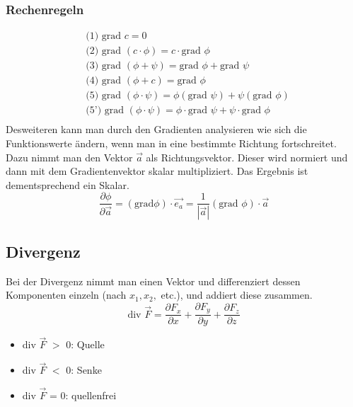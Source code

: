 \documentclass[a4paper,10pt]{scrartcl}
\begin{document}
        \subsubsection*{Rechenregeln}
        \begin{equation*}
            \begin{aligned}
                & \text{(1) } \text{grad } c = 0 \\
                & \text{(2) } \text{grad } (c \cdot \phi) = c \cdot \text{grad }\phi \\
                & \text{(3) } \text{grad } (\phi + \psi) = \text{grad } \phi + \text{grad } \psi \\
                & \text{(4) } \text{grad } (\phi + c) = \text{grad } \phi \\
                & \text{(5) } \text{grad } (\phi \cdot \psi)= \phi(\text{grad } \psi) + \psi(\text{grad } \phi) \\
                & \text{(5') } \text{grad } (\phi \cdot \psi)= \phi \cdot \text{grad } \psi + \psi \cdot \text{grad } \phi \\
            \end{aligned}
        \end{equation*}
        Desweiteren kann man durch den Gradienten analysieren wie sich die Funktionswerte ändern, wenn man in eine bestimmte Richtung fortschreitet. Dazu nimmt man den
        Vektor \(\vec{a}\) als Richtungsvektor. Dieser wird normiert und dann mit dem Gradientenvektor skalar multipliziert. Das Ergebnis ist dementsprechend ein Skalar. 
        \begin{equation*}
            \frac{\partial \phi}{\partial \vec{a}} = (\text{grad}  \phi) \cdot \vec{e_a} = \frac{1}{|\vec{a}|} (\text{grad } \phi) \cdot \vec{a}
        \end{equation*}
        
        \subsection{Divergenz}
        Bei der Divergenz nimmt man einen Vektor und differenziert dessen Komponenten einzeln (nach \(x_1, x_2,\) etc.), und addiert diese zusammen. 
        \begin{equation*}
            \text{div } \vec{F} = \frac{\partial F_x}{\partial x} + \frac{\partial F_y}{\partial y} +\frac{\partial F_z}{\partial z}
        \end{equation*} 
        \begin{itemize}
            \item div \(\vec{F}\) \(>\) 0: Quelle
            \item div \(\vec{F}\) \(<\) 0: Senke
            \item div \(\vec{F}\) = 0: quellenfrei 
        \end{itemize}
\end{document}

